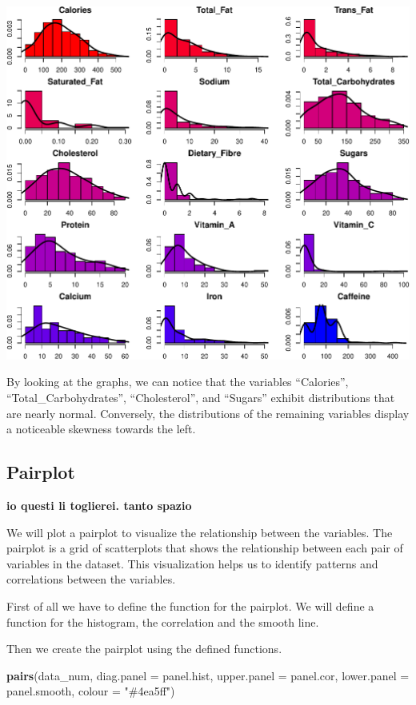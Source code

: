 \documentclass[
]{article}
\newenvironment{Shaded}{\begin{snugshade}}{\end{snugshade}}
\newcommand{\AttributeTok}[1]{\textcolor[rgb]{0.13,0.29,0.53}{#1}}
\newcommand{\FunctionTok}[1]{\textcolor[rgb]{0.13,0.29,0.53}{\textbf{#1}}}
\newcommand{\NormalTok}[1]{#1}
\newcommand{\StringTok}[1]{\textcolor[rgb]{0.31,0.60,0.02}{#1}}
\begin{document}
\begin{center}\includegraphics{Statistical_Learning_Final_Report_files/figure-latex/histograms-1} \end{center}

By looking at the graphs, we can notice that the variables ``Calories'',
``Total\_Carbohydrates'', ``Cholesterol'', and ``Sugars'' exhibit
distributions that are nearly normal. Conversely, the distributions of
the remaining variables display a noticeable skewness towards the left.

\subsection{Pairplot}\label{pairplot}

\textbf{io questi li toglierei. tanto spazio}

We will plot a pairplot to visualize the relationship between the
variables. The pairplot is a grid of scatterplots that shows the
relationship between each pair of variables in the dataset. This
visualization helps us to identify patterns and correlations between the
variables.

First of all we have to define the function for the pairplot. We will
define a function for the histogram, the correlation and the smooth
line.

Then we create the pairplot using the defined functions.

\begin{Shaded}
\begin{Highlighting}[]
\FunctionTok{pairs}\NormalTok{(data\_num, }
      \AttributeTok{diag.panel =}\NormalTok{ panel.hist,}
      \AttributeTok{upper.panel =}\NormalTok{ panel.cor, }
      \AttributeTok{lower.panel =}\NormalTok{ panel.smooth,}
      \AttributeTok{colour =} \StringTok{"\#4ea5ff"}\NormalTok{)}
\end{Highlighting}
\end{Shaded}
\end{document}
